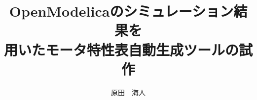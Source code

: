 \documentclass[uplatex, report, a4j, 10pt]{jsbook}
\title{OpenModelicaのシミュレーション結果を\\用いたモータ特性表自動生成ツールの試作}
\author{原田　海人}
\begin{document}
\maketitle


%
% 








%
\acknowledgment


%

\end{document}
